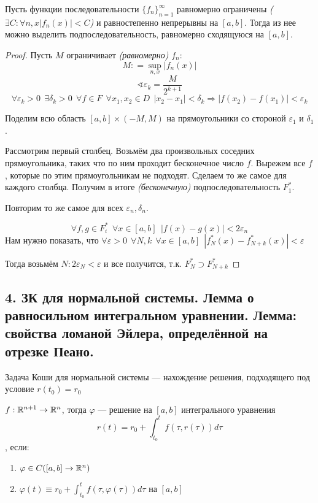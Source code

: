 \begin{lemma}
    Пусть функции последовательности \(\{f_n\}_{n = 1}^{\infty}\) равномерно ограничены \textit{(\(\exists C : \forall n, x |f_n(x)| < C\))} и равностепенно непрерывны на \([a, b]\). Тогда из нее можно выделить подпоследовательность, равномерно сходящуюся на \([a, b]\).
\end{lemma}
\begin{proof}
    Пусть \(M\) ограничивает \textit{(равномерно)} \(f_n\):
    \[M : = \sup_{n, x} |f_n(x)|\]
    \[\sphericalangle \varepsilon_k = \frac{M}{2^{k + 1}}\]
    \[\forall \varepsilon_k > 0 \ \ \exists \delta_k > 0 \ \ \forall f\in F \ \ \forall x_1, x_2\in D \ \ |x_2 - x_1|< \delta_k \Rightarrow |f(x_2) - f(x_1)|< \varepsilon_k\]

    Поделим всю область \([a, b] \times ( - M, M)\) на прямоугольники со стороной \(\varepsilon_1\) и \(\delta_1\).

    Рассмотрим первый столбец. Возьмём два произвольных соседних прямоугольника, таких что по ним проходит бесконечное число \(f\). Вырежем все \(f\), которые по этим прямоугольникам не подходят. Сделаем то же самое для каждого столбца. Получим в итоге \textit{(бесконечную)} подпоследовательность \(F^*_1\).

    Повторим то же самое для всех \(\varepsilon_n, \delta_n\).

    \[\forall f, g\in F^*_i \ \ \forall x\in[a, b] \ \ |f(x) - g(x)| < 2 \varepsilon_n\]
    Нам нужно показать, что \(\forall \varepsilon > 0 \ \ \forall N, k \ \ \forall x\in[a, b] \ \ |f^*_N(x) - f^*_{N + k}(x)|< \varepsilon\)

    Тогда возьмём \(N : 2 \varepsilon_N < \varepsilon\) и все получится, т.к. \(F^*_N \supset F^*_{N + k}\)
\end{proof}

\subsection*{4. ЗК для нормальной системы. Лемма о равносильном интегральном уравнении. Лемма: свойства ломаной Эйлера, определённой на отрезке Пеано.}

Задача Коши для нормальной системы --- нахождение решения, подходящего под условие \(r(t_0) = r_0\)

\(f : \mathbb{R}^{n + 1} \to \mathbb{R}^n\), тогда \(\varphi\) --- решение на \([a, b]\) интегрального уравнения
\[r(t) = r_0 + \int_{t_0}^t f(\tau, r(\tau)) d\tau\]
, если:
\begin{enumerate}
    \item \(\varphi\in C([a, b] \to \mathbb{R}^n)\)
    \item \(\varphi(t) \equiv r_0 + \int_{t_0}^{t} f(\tau, \varphi(\tau)) d\tau\) на \([a, b]\)
\end{enumerate}

